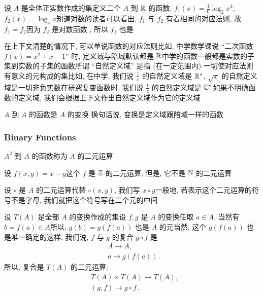\begin{example}
    设 $A$ 是全体正实数作成的集\period 定义二个 $A$ 到 $\mathbb{R}$ 的函数: $f_1 (x) = \frac16 \log_{2} {x^3}$, $f_2 (x) = \log_{4} {x}$\period 知道对数的读者可以看出, $f_1$ 与 $f_2$ 有着相同的对应法则, 故 $f_1 = f_2$\period 因为 $f_2$ 是对数函数 , 所以 $f_1$ 也是\period
\end{example}

\begin{remark}
    在上下文清楚的情况下, 可以单说函数的对应法则\period 比如, 中学数学课说 ``二次函数 $f(x) = x^2 + x - 1$'' 时, 定义域与陪域默认都是 $\mathbb{R}$\period 中学的函数一般都是实数的子集到实数的子集的函数\period 所谓 ``自然定义域'' 是指 (在一定范围内) 一切使对应法则有意义的元构成的集\period 比如, 在中学, 我们说 $\frac{1}{x}$ 的自然定义域是 $\mathbb{R}^{\ast}$, $\sqrt{x}$ 的自然定义域是一切非负实数\period 在研究复变函数时, 我们说 $\frac{1}{z}$ 的自然定义域是 $\mathbb{C}^{\ast}$\period 如果不明确函数的定义域, 我们会根据上下文作出自然定义域作为它的定义域\period
\end{remark}

\begin{definition}
    $A$ 到 $A$ 的函数是 $A$ 的变换 \period 换句话说, 变换是定义域跟陪域一样的函数\period
\end{definition}

\subsubsection*{Binary Functions}

\begin{definition}
    $A^2$ 到 $A$ 的函数称为 $A$ 的二元运算 \period
\end{definition}

\begin{example}
    设 $f(x,y) = x-y$\period 这个 $f$ 是 $\mathbb{Z}$ 的二元运算; 但是, 它不是 $\mathbb{N}$ 的二元运算\period
\end{example}

\begin{remark}
    设 $\circ$ 是 $A$ 的二元运算\period 代替 $\circ (x,y)$, 我们写 $x \circ y$\period 一般地, 若表示这个二元运算的符号不是字母, 我们就把这个符号写在二个元的中间\period
\end{remark}

\begin{definition}
    设 $T(A)$ 是全部 $A$ 的变换作成的集\period 设 $f,g$ 是 $A$ 的变换\period 任取 $a \in A$, 当然有 $b = f(a) \in A$\period 所以, $g(b) = g(f(a))$ 也是 $A$ 的元\period 当然, 这个 $g(f(a))$ 也是唯一确定的\period 这样, 我们说, $f$ 与 $g$ 的复合  $g \circ f$ 是
    \begin{align*}
         & A \to A, \tag*{$g \circ f \colon$} \\
         & a \mapsto g(f(a)) \period
    \end{align*}
    所以, 复合是 $T(A)$ 的二元运算:
    \begin{align*}
         & T(A) \times T(A) \to T(A), \tag*{$\circ \colon$} \\
         & (g,f) \mapsto g \circ f \period
    \end{align*}
\end{definition}

